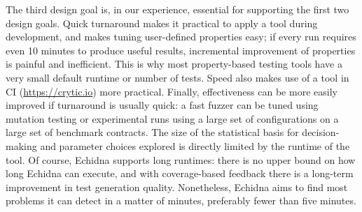 The third design goal is, in our experience, essential for supporting the first two design goals.  Quick turnaround makes it practical to apply a tool during development, and makes tuning user-defined properties easy; if every run requires even 10 minutes to produce useful results, incremental improvement of properties is painful and inefficient.  This is why most property-based testing tools have a very small default runtime or number of tests.  Speed also makes use of a tool in CI (\url{https://crytic.io}) more practical. Finally, effectiveness can be more easily improved if turnaround is usually quick: a fast fuzzer can be tuned using mutation testing \cite{MutationSurvey} or experimental runs using a large set of configurations on a large set of benchmark contracts.  The size of the statistical basis for decision-making and parameter choices explored is directly limited by the runtime of the tool.  Of course, Echidna supports long runtimes:  there is no upper bound on how long Echidna can execute, and with coverage-based feedback there is a long-term improvement in test generation quality.  Nonetheless, Echidna aims to find most problems it can detect in a matter of minutes, preferably fewer than five minutes.